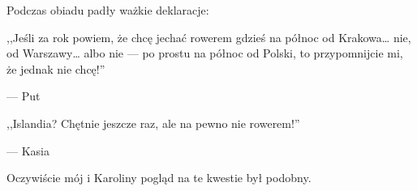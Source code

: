 
Podczas obiadu padły ważkie deklaracje:

\epigraph{,,Jeśli za rok powiem, że chcę jechać rowerem gdzieś na północ od Krakowa… nie, od Warszawy… albo nie --- po prostu na północ od Polski, to przypomnijcie mi, że jednak nie chcę!''}{--- \textup{Put}}

\epigraph{,,Islandia? Chętnie jeszcze raz, ale na pewno nie rowerem!''}{--- \textup{Kasia}}

Oczywiście mój i Karoliny pogląd na te kwestie był podobny.

